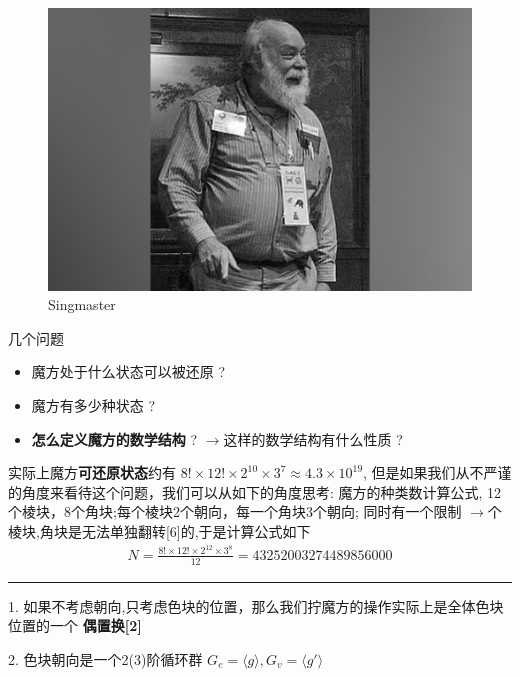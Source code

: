 \documentclass{beamer}
\newcommand{\lr}{\ensuremath{\longrightarrow}}
\begin{document}
\begin{frame}
    \begin{figure}[!htb]
        \centering
        \includegraphics[scale=.6]{./xms.jpg}
        \caption{Singmaster}
        \label{Singmaster}
    \end{figure}
\end{frame} 




\begin{frame}{几个问题}
\begin{itemize}
    \item 魔方处于什么状态可以被还原 ?
    \item 魔方有多少种状态 ?
    \item {\bf 怎么定义魔方的数学结构} ? \lr  这样的数学结构有什么性质 ?
\end{itemize}
\end{frame} 


\begin{frame}
实际上魔方{\bf 可还原状态}约有 $8!\times 12!\times 2^{10}\times 3^7 \approx 4.3\times 10^{19}$,
但是如果我们从不严谨的角度来看待这个问题，我们可以从如下的角度思考:
魔方的种类数计算公式, 12个棱块，8个角块;每个棱块2个朝向，每一个角块3个朝向;
同时有一个限制 \lr 个棱块,角块是无法单独翻转[6]的,于是计算公式如下
\begin{align*}
     N = \frac{8!\times 12!\times 2^{12}\times 3^8}{12} = 43252003274489856000
\end{align*}
\end{frame} 

\begin{frame}
    \kaishu
    \noindent\rule{1\linewidth}{2pt}

    1. 如果不考虑朝向,只考虑色块的位置，那么我们拧魔方的操作实际上是全体色块位置的一个 {\bf 偶置换[2]}

    2. 色块朝向是一个2(3)阶循环群 $G_e = \langle g \rangle, G_v = \langle g' \rangle$
\end{frame} 
\end{document}
